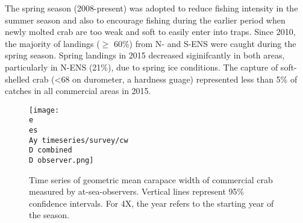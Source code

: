 \documentclass[paper=a4, fontsize=11pt]{article}
\newcommand{\D}{.}
\newcommand{\e}{\string~/ecomod_data/}
\newcommand{\es}{snowcrab/}
\newcommand{\Ay}{assessments/2015/}
\begin{document}
The spring season (2008-present) was adopted to reduce fishing intensity in the summer season and also to encourage fishing during the earlier period when newly molted crab are too weak and soft to easily enter into traps. Since 2010, the majority of landings ($\geq$ 60\%) from N- and S-ENS were caught during the spring season. Spring landings in 2015 decreased siginifcantly in both areas, particularly in N-ENS (21\%), due to spring ice conditions. The capture of soft-shelled crab (<68 on durometer, a hardness guage) represented less than 5\% of catches in all commercial areas in 2015.\\

\begin{figure}[h]
    \centering
    \texttt{[image: \\e \\es \\Ay timeseries/survey/cw\\D combined\\D observer.png]}
    \caption{Time series of geometric mean carapace width of commercial crab measured by at-sea-observers. Vertical lines represent 95\% confidence intervals. For 4X, the year refers to the starting year of the season.}
\end{figure}
\end{document}
